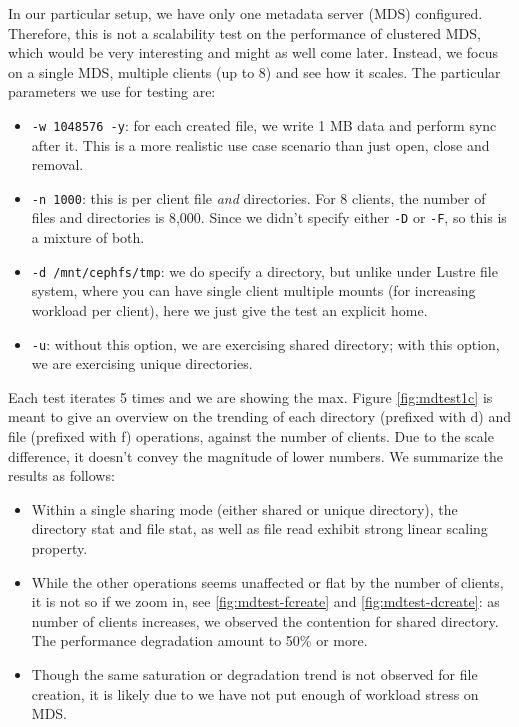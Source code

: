 \documentclass{article}
\begin{document}
In our particular setup, we have only one metadata server (MDS)
configured. Therefore, this is not a scalability test on the performance of
clustered MDS, which would be very interesting and might as well come later.
Instead, we focus on a single MDS, multiple clients (up to 8) and see how it
scales. The particular parameters we use for testing are:

\begin{itemize}
\item \verb!-w 1048576 -y!: for each created file, we write 1 MB data and
perform sync after it. This is a more realistic use case scenario than just
open, close and removal.

\item \verb!-n 1000!: this is per client file \textit{and} directories. For 8
clients, the number of files and directories is 8,000. Since we didn't specify
either \verb!-D! or \verb!-F!, so this is a mixture of both.

\item \verb!-d /mnt/cephfs/tmp!: we do specify a directory, but unlike under
Lustre file system, where you can have single client multiple mounts (for
increasing workload per client), here we just give the test an explicit home.

\item \verb!-u!: without this option, we are exercising shared directory; with
this option, we are exercising unique directories.

\end{itemize}

Each test iterates 5 times and we are showing the max. Figure
\ref{fig:mdtest1c} is meant to give an overview on the trending of each
directory (prefixed with d) and file (prefixed with f) operations, against the
number of clients. Due to the scale difference, it doesn't convey the
magnitude of lower numbers. We summarize the results as follows:

\begin{itemize}

\item Within a single sharing mode (either shared or unique directory), the
directory stat and file stat, as well as file read exhibit strong linear
scaling property. 

\item While the other operations seems unaffected or flat by the number of
clients, it is not so if we zoom in, see \ref{fig:mdtest-fcreate} and
\ref{fig:mdtest-dcreate}:  as number of clients increases, we observed the
contention for shared directory. The performance degradation amount to 50\% or
more.

\item Though the same saturation or degradation trend is not observed for file
creation, it is likely due to we have not put enough of workload stress on MDS.

\end{itemize}
\end{document}
